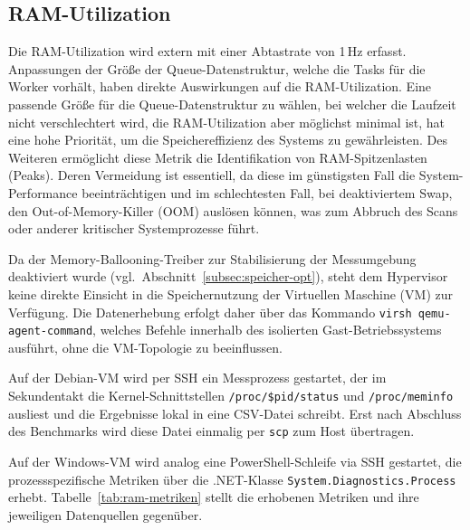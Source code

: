 \begin{sloppypar}
\subsection{\acs{RAM}-Utilization}
Die \acs{RAM}-Utilization wird extern mit einer Abtastrate von 1\,Hz erfasst.
Anpassungen der Größe der Queue-Datenstruktur, welche die Tasks für die Worker vorhält,
haben direkte Auswirkungen auf die \acs{RAM}-Utilization.
Eine passende Größe für die Queue-Datenstruktur zu wählen,
bei welcher die Laufzeit nicht verschlechtert wird, die \acs{RAM}-Utilization aber möglichst minimal ist,
hat eine hohe Priorität, um die Speichereffizienz des Systems zu gewährleisten.
Des Weiteren ermöglicht diese Metrik die Identifikation von \acs{RAM}-Spitzenlasten (Peaks).
Deren Vermeidung ist essentiell, da diese im günstigsten Fall die System-Performance beeinträchtigen
und im schlechtesten Fall, bei deaktiviertem Swap, den Out-of-Memory-Killer (\acs{OOM}) auslösen können,
was zum Abbruch des Scans oder anderer kritischer Systemprozesse führt.

\vspace{7.56mm}

\noindent Da der Memory-Ballooning-Treiber zur Stabilisierung der Messumgebung deaktiviert wurde (vgl.\ Abschnitt~\ref{subsec:speicher-opt}),
steht dem Hypervisor keine direkte Einsicht in die Speichernutzung der Virtuellen Maschine (\acs{VM}) zur Verfügung.
Die Datenerhebung erfolgt daher über das Kommando \texttt{virsh qemu-agent-command},
welches Befehle innerhalb des isolierten Gast-Betriebssystems ausführt, ohne die \acs{VM}-Topologie zu beeinflussen.

\vspace{7.56mm}

\noindent Auf der Debian-\acs{VM} wird per \acs{SSH} ein Messprozess gestartet, der im Sekundentakt
die Kernel-Schnittstellen \texttt{/proc/\$pid/status} und \texttt{/proc/meminfo} ausliest
und die Ergebnisse lokal in eine \acs{CSV}-Datei schreibt.
Erst nach Abschluss des Benchmarks wird diese Datei einmalig per \texttt{scp} zum Host übertragen.

\vspace{7.56mm}

\noindent Auf der Windows-\acs{VM} wird analog eine PowerShell-Schleife via \acs{SSH} gestartet,
die prozessspezifische Metriken über die .NET-Klasse \texttt{System.Diagnostics.Process} erhebt.
Tabelle~\ref{tab:ram-metriken} stellt die erhobenen Metriken und ihre jeweiligen Datenquellen gegenüber.


\end{sloppypar}
